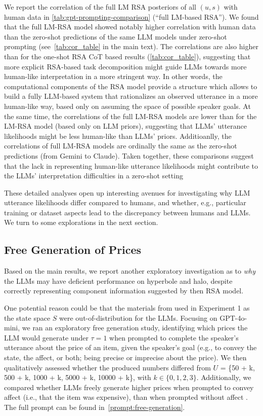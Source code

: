 We report the correlation of the full LM RSA posteriors of all $(u, s)$ with human data in \autoref{tab:gpt-prompting-comparison} (``full LM-based RSA''). 
We found that the full LM-RSA model showed notably higher correlation with human data than the zero-shot predictions of the same LLM models under zero-shot prompting (see~\autoref{tab:cor_table} in the main text).
The correlations are also higher than for the one-shot RSA CoT based results (\autoref{tab:cor_table}), suggesting that more explicit RSA-based task decomposition might guide LLMs towards more human-like interpretation in a more stringent way.
In other words, the computational components of the RSA model provide a structure which allows to build a fully LLM-based system that rationalizes an observed utterance in a more human-like way, based  only on assuming the space of possible speaker goals.
At the same time, the correlations of the full LM-RSA models are lower than for the LM-RSA model (based only on LLM priors), suggesting that LLMs' utterance likelihoods might be less human-like than LLMs' priors. 
Additioanlly, the correlations of full LM-RSA models are ordinally the same as the zero-shot predictions (from Gemini to Claude). 
Taken together, these comparisons suggest that the lack in representing human-like utterance likelihoods might contribute to the LLMs' interpretation difficulties in a zero-shot setting

These detailed analyses open up interesting avenues for investigating why LLM utterance likelihoods differ compared to humans, and whether, e.g., particular training or dataset aspects lead to the discrepancy between humans and LLMs.
We turn to some explorations in the next section.

\subsection{Free Generation of Prices}
Based on the main results, we report another exploratory investigation as to \textit{why} the LLMs may have deficient performance on hyperbole and halo, despite correctly representing component information suggested by then RSA model. 

One potential reason could be that the materials from \citet{kao2014nonliteral} used in Experiment 1 as the state space $S$ were out-of-distribution for the LLMs.
Focusing on GPT-4o-mini, we ran an exploratory free generation study, identifying which prices the LLM would generate under $\tau=1$ when prompted to complete the speaker's utterance about the price of an item, given the speaker's goal (e.g., to convey the state, the affect, or both; being precise or imprecise about the price). 
We then qualitatively assessed whether the produced numbers differed from $U$ = \{50 + k, 500 + k, 1000 + k, 5000 + k, 10000 + k\}, with $k \in \{0, 1, 2, 3\}$.
Additionally, we compared whether LLMs freely generate higher prices when prompted to convey affect (i.e., that the item was expensive), than when prompted without affect . The full prompt can be found in~\autoref{prompt:free-generation}. 


